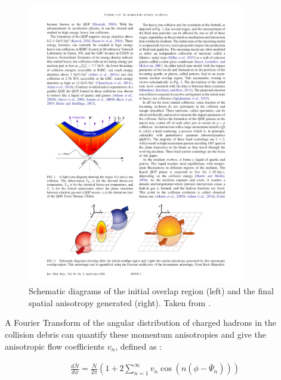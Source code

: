 \begin{figure}[htbp]
\begin{center}
\includegraphics[width=0.85\textwidth]{figures/theory/overlap}
\caption{Schematic diagrams of the initial overlap region (left) and the final spatial anisotropy generated (right). Taken from \cite{RevModPhys.90.025005}.}
\label{fig:overlap}
\end{center}
\end{figure}


A Fourier Transform of the angular distribution of charged hadrons in the collision debris can quantify these momentum anisotropies and give the anisotropic flow coefficients $v_n$, defined as \cite{Poskanzer:1998yz}:

\begin{align}
\frac{d\bar{N}}{d\phi} = \frac{\bar{N}}{2\pi} \left( 1 + 2 \sum_{n=1}^{\infty} v_{n} \cos(n(\phi-\bar{\Psi}_n)) \right)
\end{align}

